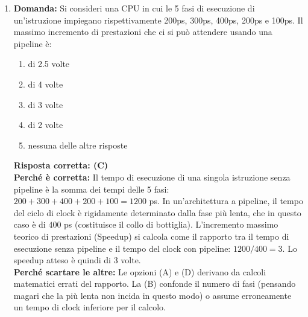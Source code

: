 \documentclass[12pt, a4paper]{article}
\begin{document}
\begin{enumerate}

    \item \textbf{Domanda:} Si consideri una CPU in cui le 5 fasi di esecuzione di un'istruzione impiegano rispettivamente 200ps, 300ps, 400ps, 200ps e 100ps. Il massimo incremento di prestazioni che ci si può attendere usando una pipeline è:
    \begin{enumerate}[label=(\Alph*)]
        \item di 2.5 volte
        \item di 4 volte
        \item di 3 volte
        \item di 2 volte
        \item nessuna delle altre risposte
    \end{enumerate}
    \textbf{Risposta corretta: (C)} \\
    \textbf{Perché è corretta:} Il tempo di esecuzione di una singola istruzione senza pipeline è la somma dei tempi delle 5 fasi: $200 + 300 + 400 + 200 + 100 = 1200$ ps. 
    In un'architettura a pipeline, il tempo del ciclo di clock è rigidamente determinato dalla fase più lenta, che in questo caso è di $400$ ps (costituisce il collo di bottiglia). L'incremento massimo teorico di prestazioni (Speedup) si calcola come il rapporto tra il tempo di esecuzione senza pipeline e il tempo del clock con pipeline: $1200 / 400 = 3$. Lo speedup atteso è quindi di 3 volte. \\
    \textbf{Perché scartare le altre:} Le opzioni (A) e (D) derivano da calcoli matematici errati del rapporto. La (B) confonde il numero di fasi (pensando magari che la più lenta non incida in questo modo) o assume erroneamente un tempo di clock inferiore per il calcolo.


\end{enumerate}
\end{document}
